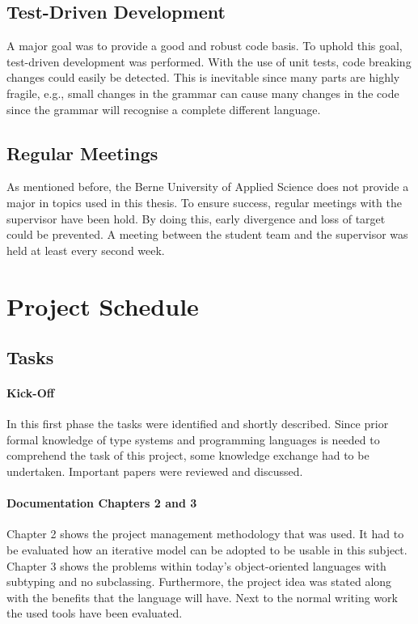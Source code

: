 \subsection{Test-Driven Development}
A major goal was to provide a good and robust code basis. To uphold this
goal, test-driven development was performed. With the use of
unit tests, code breaking changes could easily be detected. This is inevitable
since many parts are highly fragile, e.g., small changes in the grammar can
cause many changes in the code since the grammar will recognise a complete
different language.

\subsection{Regular Meetings}
As mentioned before, the Berne University of Applied Science does not provide a major in
topics used in this thesis. To ensure success, regular meetings with the
supervisor have been hold. By doing this, early divergence and loss of target could
be prevented. A meeting between the student team and the supervisor
was held at least every second week.

\section{Project Schedule}
\subsection{Tasks}
\paragraph{Kick-Off}
In this first phase the tasks were identified and shortly
described. Since prior formal knowledge of type systems and programming
languages is needed to comprehend the task of this project, some
knowledge exchange had to be undertaken. Important papers were reviewed
and discussed.

\paragraph{Documentation Chapters 2 and 3}
Chapter 2 shows the project management methodology that was used. It had to be
evaluated how an iterative model can be adopted to be usable in this
subject. Chapter 3 shows the problems within today's object-oriented
languages with subtyping and no subclassing. Furthermore, the project idea
was stated along with the benefits that the language will have. Next
to the normal writing work the used tools have been evaluated.

